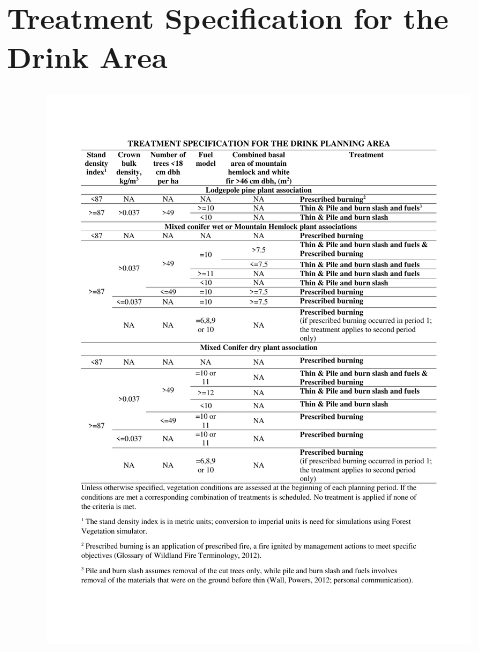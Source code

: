 
\chapter{Treatment Specification for the Drink Area}
\label{chap:appBTreatmentSpec}
\begin{figure}[ht!]
\centering
\includegraphics[width=\textwidth]{./appB/TreatmentSpecsForDrink.pdf}
\end{figure}
